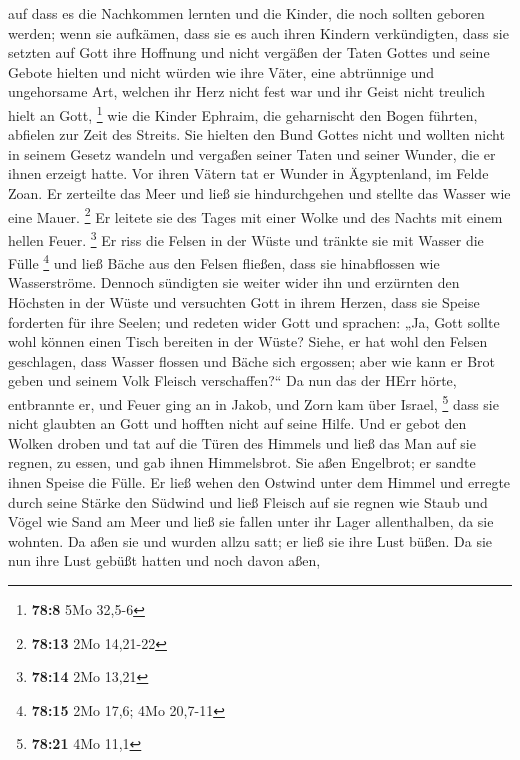  auf dass es die Nachkommen lernten und die Kinder, die noch
sollten geboren werden; wenn sie aufkämen, dass sie es auch ihren
Kindern verkündigten,  dass sie setzten auf Gott ihre
Hoffnung und nicht vergäßen der Taten Gottes und seine Gebote hielten
 und nicht würden wie ihre Väter, eine abtrünnige und
ungehorsame Art, welchen ihr Herz nicht fest war und ihr Geist nicht
treulich hielt an Gott, \footnote{\textbf{78:8} 5Mo 32,5-6} 
wie die Kinder Ephraim, die geharnischt den Bogen führten, abfielen zur
Zeit des Streits.  Sie hielten den Bund Gottes nicht und
wollten nicht in seinem Gesetz wandeln  und vergaßen seiner
Taten und seiner Wunder, die er ihnen erzeigt hatte.  Vor
ihren Vätern tat er Wunder in Ägyptenland, im Felde Zoan. 
Er zerteilte das Meer und ließ sie hindurchgehen und stellte das Wasser
wie eine Mauer. \footnote{\textbf{78:13} 2Mo 14,21-22}  Er
leitete sie des Tages mit einer Wolke und des Nachts mit einem hellen
Feuer. \footnote{\textbf{78:14} 2Mo 13,21}  Er riss die
Felsen in der Wüste und tränkte sie mit Wasser die Fülle \footnote{\textbf{78:15}
  2Mo 17,6; 4Mo 20,7-11}  und ließ Bäche aus den Felsen
fließen, dass sie hinabflossen wie Wasserströme.  Dennoch
sündigten sie weiter wider ihn und erzürnten den Höchsten in der Wüste
 und versuchten Gott in ihrem Herzen, dass sie Speise
forderten für ihre Seelen;  und redeten wider Gott und
sprachen: „Ja, Gott sollte wohl können einen Tisch bereiten in der
Wüste?  Siehe, er hat wohl den Felsen geschlagen, dass
Wasser flossen und Bäche sich ergossen; aber wie kann er Brot geben und
seinem Volk Fleisch verschaffen?{}``  Da nun das der HErr
hörte, entbrannte er, und Feuer ging an in Jakob, und Zorn kam über
Israel, \footnote{\textbf{78:21} 4Mo 11,1}  dass sie nicht
glaubten an Gott und hofften nicht auf seine Hilfe.  Und er
gebot den Wolken droben und tat auf die Türen des Himmels 
und ließ das Man auf sie regnen, zu essen, und gab ihnen Himmelsbrot.
 Sie aßen Engelbrot; er sandte ihnen Speise die Fülle.
 Er ließ wehen den Ostwind unter dem Himmel und erregte
durch seine Stärke den Südwind  und ließ Fleisch auf sie
regnen wie Staub und Vögel wie Sand am Meer  und ließ sie
fallen unter ihr Lager allenthalben, da sie wohnten.  Da
aßen sie und wurden allzu satt; er ließ sie ihre Lust büßen.
 Da sie nun ihre Lust gebüßt hatten und noch davon aßen,
